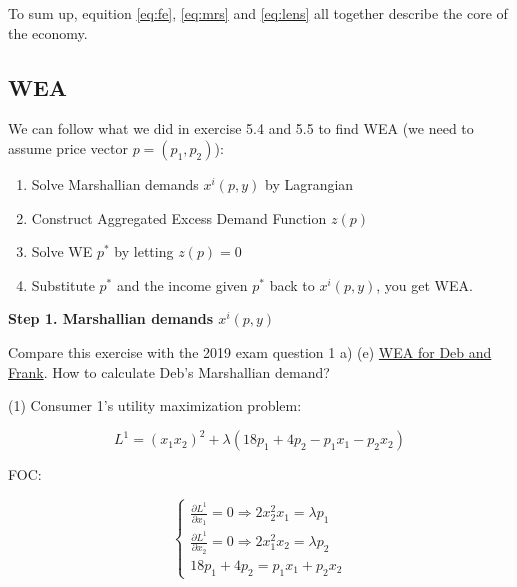 \documentclass{article}
\begin{document}
To sum up, equition \ref{eq:fe}, \ref{eq:mrs} and \ref{eq:lens} all together  describe the core of the economy.

\subsection{WEA}

\begin{mdframed}[backgroundcolor=blue!20,linecolor=white]

We can follow what we did in exercise 5.4 and 5.5 to find WEA
(we need to assume price vector $p=(p_1,p_2)$):

\begin{enumerate}
\item Solve Marshallian demands $x^i(p,y)$ by Lagrangian
\item Construct Aggregated Excess Demand Function $z(p)$ 
\item Solve WE $p^*$ by letting $z(p) = 0$
\item Substitute $p^*$ and the income given $p^*$ back to $x^i(p,y)$, you get WEA.
\end{enumerate}
\end{mdframed}

\newpage

\textbf{Step 1. Marshallian demands $x^i(p,y)$}

\vspace{3mm}

\begin{mdframed}[backgroundcolor=yellow!20,linecolor=white]
Compare this exercise with the 2019 exam question 1 a) (e) \href{https://www.uio.no/studier/emner/sv/oekonomi/ECON4220/previous-exams/econ32_4220_2019h_sensorveiledning.pdf}{WEA for Deb and Frank}. How to calculate Deb's Marshallian demand?
\end{mdframed}

\vspace{3mm}


(1) Consumer 1's utility maximization problem:

$$L^1 = (x_1x_2)^2 + \lambda (18p_1 +4p_2 - p_1x_1 -p_2x_2) $$

FOC:

\begin{equation}
    \begin{cases}
\frac{\partial L^1}{\partial x_1} = 0  \Rightarrow 2x_2^2x_1 = \lambda p_1 \\
\frac{\partial L^1}{\partial x_2} = 0  \Rightarrow 2x_1^2x_2 = \lambda p_2 \\
18p_1 +4p_2 = p_1x_1 + p_2x_2
    \end{cases}
    \nonumber
\end{equation}
\end{document}

